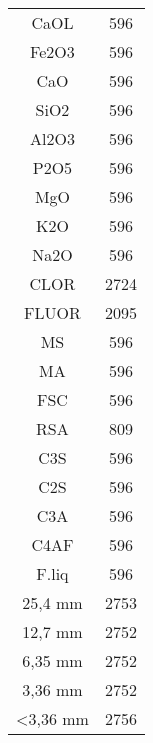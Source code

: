 \begin{center}
\begin{tabular}{ c c }
 CaOL       &      596\\
Fe2O3       &    596\\
CaO         &   596\\
SiO2        &  596\\
Al2O3       & 596\\
P2O5        & 596\\
MgO         & 596\\
K2O         & 596\\
Na2O        & 596\\
CLOR        & 2724\\
FLUOR       & 2095\\
MS          & 596\\
MA          & 596\\
FSC         & 596\\
RSA         & 809\\
C3S         & 596\\
C2S         & 596\\
C3A         & 596\\
C4AF        & 596\\
F.liq       & 596\\
25,4 mm     & 2753\\
12,7 mm     & 2752\\
6,35  mm    & 2752\\
3,36 mm     & 2752\\
\textless 3,36 mm    & 2756
\end{tabular}
\end{center}
\newpage
{}
